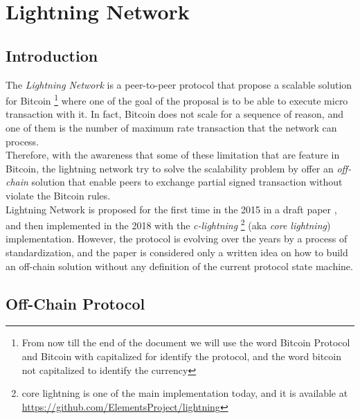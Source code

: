 \setcounter{page}{1}

\chapter{Lightning Network}

\newcommand{\noteOnBitcoinNaming}[0]{
    \footnote{
        From now till the end of the document we will use the word Bitcoin Protocol and
        Bitcoin with capitalized for identify the protocol, and the word bitcoin not capitalized to identify the currency
    }
}

\newcommand{\noteOnCLNImpl}[0]{
    \footnote{
    core lightning is one of the main implementation today, and it is available at
    \href{https://github.com/ElementsProject/lightning}{https://github.com/ElementsProject/lightning}
    }
}



\section{Introduction}

The \emph{Lightning Network} is a peer-to-peer protocol that propose a scalable solution for Bitcoin\noteOnBitcoinNaming where one
of the goal of the proposal is to be able to execute micro transaction with it.
In fact, Bitcoin does not scale for a sequence of reason, and one of them is the number of
maximum rate transaction that the network can process.\\
Therefore, with the awareness that some of these limitation that are feature in Bitcoin, the lightning network try to solve
the scalability problem by offer an \emph{off-chain} solution that enable peers to exchange partial
signed transaction without violate the Bitcoin rules.\\
Lightning Network is proposed for the first time in the 2015 in a draft paper \cite{lightning-network-paper},
and then implemented in the 2018 with the \emph{c-lightning}\noteOnCLNImpl (aka \emph{core lightning}) implementation.
However, the protocol is evolving over the years by a process of standardization\cite{lightning-bolts}, and the paper is considered
only a written idea on how to build an off-chain solution without any definition of the current protocol state machine.

\section{Off-Chain Protocol}

